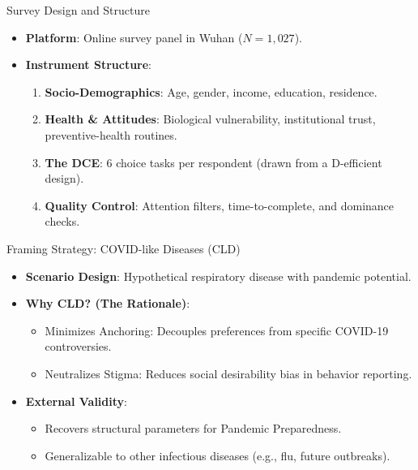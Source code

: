 \documentclass[10pt]{beamer}
\begin{document}
\begin{frame}{Survey Design and Structure}
\begin{itemize}
\item \textbf{Platform}: Online survey panel in Wuhan ($N=1,027$).
\item \textbf{Instrument Structure}:
\begin{enumerate}
\item \textbf{Socio-Demographics}: Age, gender, income, education, residence.
\item \textbf{Health \& Attitudes}: Biological vulnerability, institutional trust, preventive-health routines.
\item \textbf{The DCE}: 6 choice tasks per respondent (drawn from a D-efficient design).
\item \textbf{Quality Control}: Attention filters, time-to-complete, and dominance checks.
\end{enumerate}
\end{itemize}
\end{frame}


\begin{frame}{Framing Strategy: COVID-like Diseases (CLD)}
  \begin{itemize}
    \item \textbf{Scenario Design}: Hypothetical respiratory disease with pandemic potential.
    \item \textbf{Why CLD? (The Rationale)}:
      \begin{itemize}
        \item \alert{Minimizes Anchoring}: Decouples preferences from specific COVID-19 controversies.
        \item \alert{Neutralizes Stigma}: Reduces social desirability bias in behavior reporting.
      \end{itemize}
    \item \textbf{External Validity}:
      \begin{itemize}
        \item Recovers structural parameters for \alert{Pandemic Preparedness}.
        \item Generalizable to other infectious diseases (e.g., flu, future outbreaks).
      \end{itemize}
  \end{itemize}
\end{frame}
\end{document}
